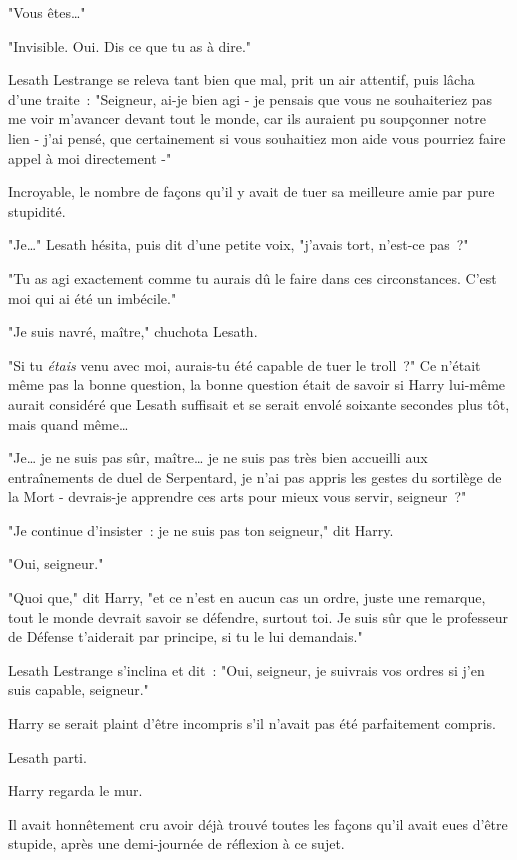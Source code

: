 "Vous êtes…"

"Invisible. Oui. Dis ce que tu as à dire."

Lesath Lestrange se releva tant bien que mal, prit un air attentif, puis lâcha d'une traite~: "Seigneur, ai-je bien agi - je pensais que vous ne souhaiteriez pas me voir m'avancer devant tout le monde, car ils auraient pu soupçonner notre lien - j'ai pensé, que certainement si vous souhaitiez mon aide vous pourriez faire appel à moi directement -"

Incroyable, le nombre de façons qu'il y avait de tuer sa meilleure amie par pure stupidité.

"Je…" Lesath hésita, puis dit d'une petite voix, "j'avais tort, n'est-ce pas~?"

"Tu as agi exactement comme tu aurais dû le faire dans ces circonstances. C'est moi qui ai été un imbécile."

"Je suis navré, maître," chuchota Lesath.

"Si tu \emph{étais} venu avec moi, aurais-tu été capable de tuer le troll~?" Ce n'était même pas la bonne question, la bonne question était de savoir si Harry lui-même aurait considéré que Lesath suffisait et se serait envolé soixante secondes plus tôt, mais quand même…

"Je… je ne suis pas sûr, maître… je ne suis pas très bien accueilli aux entraînements de duel de Serpentard, je n'ai pas appris les gestes du sortilège de la Mort - devrais-je apprendre ces arts pour mieux vous servir, seigneur~?"

"Je continue d'insister~: je ne suis pas ton seigneur," dit Harry.

"Oui, seigneur."

"Quoi que," dit Harry, "et ce n'est en aucun cas un ordre, juste une remarque, tout le monde devrait savoir se défendre, surtout toi. Je suis sûr que le professeur de Défense t'aiderait par principe, si tu le lui demandais."

Lesath Lestrange s'inclina et dit~: "Oui, seigneur, je suivrais vos ordres si j'en suis capable, seigneur."

Harry se serait plaint d'être incompris s'il n'avait pas été parfaitement compris.

Lesath parti.

Harry regarda le mur.

Il avait honnêtement cru avoir déjà trouvé toutes les façons qu'il avait eues d'être stupide, après une demi-journée de réflexion à ce sujet.

